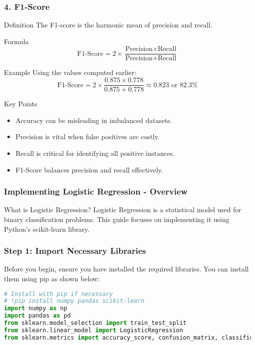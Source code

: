 \documentclass[aspectratio=169]{beamer}
\begin{document}
\begin{frame}[fragile]
    \frametitle{4. F1-Score}
    \begin{block}{Definition}
        The F1-score is the harmonic mean of precision and recall.
    \end{block}
    \begin{block}{Formula}
        \begin{equation}
        \text{F1-Score} = 2 \times \frac{\text{Precision} \times \text{Recall}}{\text{Precision} + \text{Recall}}
        \end{equation}
    \end{block}
    \begin{block}{Example}
        Using the values computed earlier:
        \[
        \text{F1-Score} = 2 \times \frac{0.875 \times 0.778}{0.875 + 0.778} \approx 0.823 \text{ or } 82.3\%
        \]
    \end{block}
    \begin{block}{Key Points}
        \begin{itemize}
            \item Accuracy can be misleading in imbalanced datasets.
            \item Precision is vital when false positives are costly.
            \item Recall is critical for identifying all positive instances.
            \item F1-Score balances precision and recall effectively.
        \end{itemize}
    \end{block}
\end{frame}

\begin{frame}[fragile]
    \frametitle{Implementing Logistic Regression - Overview}
    \begin{block}{What is Logistic Regression?}
        Logistic Regression is a statistical model used for binary classification problems. 
        This guide focuses on implementing it using Python's scikit-learn library.
    \end{block}
\end{frame}

\begin{frame}[fragile]
    \frametitle{Step 1: Import Necessary Libraries}
    Before you begin, ensure you have installed the required libraries. 
    You can install them using pip as shown below:
    \begin{lstlisting}[language=Python]
# Install with pip if necessary
# !pip install numpy pandas scikit-learn
import numpy as np
import pandas as pd
from sklearn.model_selection import train_test_split
from sklearn.linear_model import LogisticRegression
from sklearn.metrics import accuracy_score, confusion_matrix, classification_report
    \end{lstlisting}
\end{frame}
\end{document}
